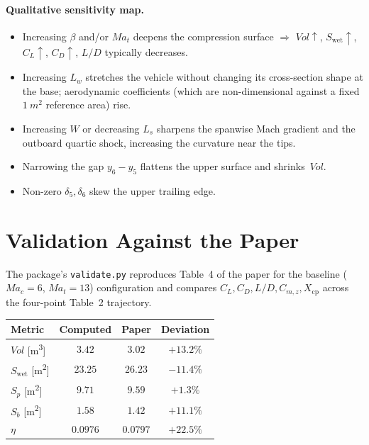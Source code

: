 \documentclass[11pt,a4paper]{article}
\newcommand{\Ma}{\mathit{Ma}}
\newcommand{\Vol}{\mathit{Vol}}
\newcommand{\Swet}{S_{\mathrm{wet}}}
\newcommand{\Sp}{S_{p}}
\newcommand{\Sb}{S_{b}}
\newcommand{\Lw}{L_{w}}
\newcommand{\Ls}{L_{s}}
\begin{document}
\paragraph{Qualitative sensitivity map.}
\begin{itemize}
\item Increasing $\beta$ and/or $\Ma_{t}$ deepens the compression
      surface $\Rightarrow$ $\Vol{\uparrow}$, $\Swet{\uparrow}$,
      $C_{L}{\uparrow}$, $C_{D}{\uparrow}$, $L/D$ typically decreases.
\item Increasing $\Lw$ stretches the vehicle without changing its
      cross-section shape at the base; aerodynamic coefficients (which
      are non-dimensional against a fixed $\SI{1}{m^{2}}$ reference
      area) rise.
\item Increasing $W$ or decreasing $\Ls$ sharpens the spanwise Mach
      gradient and the outboard quartic shock, increasing the curvature
      near the tips.
\item Narrowing the gap $y_{6}-y_{5}$ flattens the upper surface and
      shrinks~$\Vol$.
\item Non-zero $\delta_{5},\delta_{6}$ skew the upper trailing edge.
\end{itemize}

\section{Validation Against the Paper}

The package's \texttt{validate.py} reproduces Table~4 of the paper for
the baseline (\mbox{$\Ma_{c}=6$}, $\Ma_{t}=13$) configuration and
compares $C_{L}, C_{D}, L/D, C_{m,z}, X_{\mathrm{cp}}$ across the
four-point Table~2 trajectory.

\begin{center}
\begin{tabular}{@{}lccc@{}}
\toprule
Metric & Computed & Paper & Deviation \\
\midrule
$\Vol$   [\si{m^{3}}]  & $3.42$   & $3.02$   & $+13.2\%$ \\
$\Swet$  [\si{m^{2}}]  & $23.25$  & $26.23$  & $-11.4\%$ \\
$\Sp$    [\si{m^{2}}]  & $9.71$   & $9.59$   & $+1.3\%$  \\
$\Sb$    [\si{m^{2}}]  & $1.58$   & $1.42$   & $+11.1\%$ \\
$\eta$                 & $0.0976$ & $0.0797$ & $+22.5\%$ \\
\bottomrule
\end{tabular}
\end{center}
\end{document}
